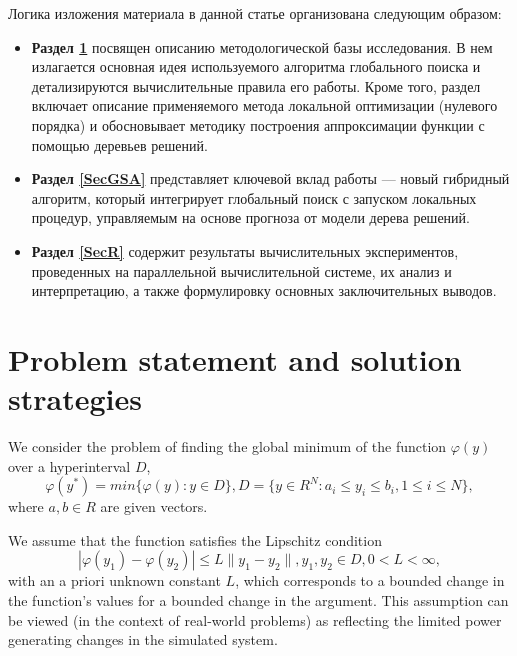 \documentclass[runningheads]{llncs}
\begin{document}
Логика изложения материала в данной статье организована следующим образом:
\begin{itemize}
	\item \textbf{Раздел \ref{SecA}} посвящен описанию методологической базы исследования. В нем излагается основная идея используемого алгоритма глобального поиска и детализируются вычислительные правила его работы. Кроме того, раздел включает описание применяемого метода локальной оптимизации (нулевого порядка) и обосновывает методику построения аппроксимации функции с помощью деревьев решений.
	\item \textbf{Раздел \ref{SecGSA}} представляет ключевой вклад работы — новый гибридный алгоритм, который интегрирует глобальный поиск с запуском локальных процедур, управляемым на основе прогноза от модели дерева решений.
	\item \textbf{Раздел \ref{SecR}} содержит результаты вычислительных экспериментов, проведенных на параллельной вычислительной системе, их анализ и интерпретацию, а также формулировку основных заключительных выводов.
\end{itemize}


\section{Problem statement and solution strategies}\label{SecA}

We consider the problem of finding the global minimum of the function $\varphi(y)$ over a hyperinterval $D$, 
\begin{equation} \label{sec:problem}   
	\varphi(y^*) = min\{\varphi(y):y\in D\}, D = \{y \in R^N : a_i \leq y_i \leq b_i, 1 \leq i \leq N \},
\end{equation}
where $a,b \in R$ are given vectors.

We assume that the function satisfies the Lipschitz condition 
\begin{displaymath} 
	|\varphi(y_1)-\varphi(y_2)|\leq L\parallel y_1-y_2 \parallel ,y_1,y_2 \in D, 0<L< \infty, 
\end{displaymath}
with an a priori unknown constant $L$, which corresponds to a bounded change in the function's values for a bounded change in the argument.
This assumption can be viewed (in the context of real-world problems) as reflecting the limited power generating changes in the simulated system.
\end{document}
